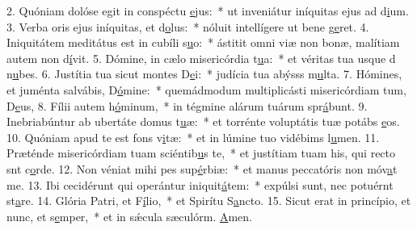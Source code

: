 2. Quóniam dolóse egit in conspéctu \uline{e}jus:~* ut inveniátur iníquitas ejus ad d\uline{i}um.
3. Verba oris ejus iníquitas, et d\uline{o}lus:~* nóluit intellígere ut bene g\uline{e}ret.
4. Iniquitátem meditátus est in cubíli s\uline{u}o:~* ástitit omni viæ non bonæ, malítiam autem non d\uline{í}vit.
5. Dómine, in cælo misericórdia t\uline{u}a:~* et véritas tua usque d n\uline{u}bes.
6. Justítia tua sicut montes D\uline{e}i:~* judícia tua abýsss m\uline{u}lta.
7. Hómines, et juménta salvábis, D\uline{ó}mine:~* quemádmodum multiplicásti misericórdiam tum, D\uline{e}us,
8. Fílii autem h\uline{ó}minum,~* in tégmine alárum tuárum spr\uline{á}bunt.
9. Inebriabúntur ab ubertáte domus t\uline{u}æ:~* et torrénte voluptátis tuæ potábs \uline{e}os.
10. Quóniam apud te est fons v\uline{i}tæ:~* et in lúmine tuo vidébims l\uline{u}men.
11. Præténde misericórdiam tuam sciéntib\uline{u}s te,~* et justítiam tuam his, qui recto snt c\uline{o}rde.
12. Non véniat mihi pes sup\uline{é}rbiæ:~* et manus peccatóris non móv\uline{a}t me.
13. Ibi cecidérunt qui operántur iniquit\uline{á}tem:~* expúlsi sunt, nec potuérnt st\uline{a}re.
14. Glória Patri, et F\uline{í}lio,~* et Spirítu S\uline{a}ncto.
15. Sicut erat in princípio, et nunc, et s\uline{e}mper,~* et in sǽcula sæculórm. \uline{A}men.
